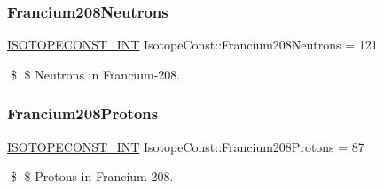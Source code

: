 \subsubsection{\texorpdfstring{Francium208\+Neutrons}{Francium208Neutrons}}
{\footnotesize\ttfamily \mbox{\hyperlink{group___isotope_const-_macros_ga5f18360b3e99483a35c32d789e62621c}{I\+S\+O\+T\+O\+P\+E\+C\+O\+N\+S\+T\+\_\+\+I\+NT}} Isotope\+Const\+::\+Francium208\+Neutrons = 121}

\$ \$ Neutrons in Francium-\/208. \mbox{\label{group___isotope_const-_francium-_fr208_gadb448e7a2569972d955fd7b69289a535}} 
\subsubsection{\texorpdfstring{Francium208\+Protons}{Francium208Protons}}
{\footnotesize\ttfamily \mbox{\hyperlink{group___isotope_const-_macros_ga5f18360b3e99483a35c32d789e62621c}{I\+S\+O\+T\+O\+P\+E\+C\+O\+N\+S\+T\+\_\+\+I\+NT}} Isotope\+Const\+::\+Francium208\+Protons = 87}

\$ \$ Protons in Francium-\/208. 